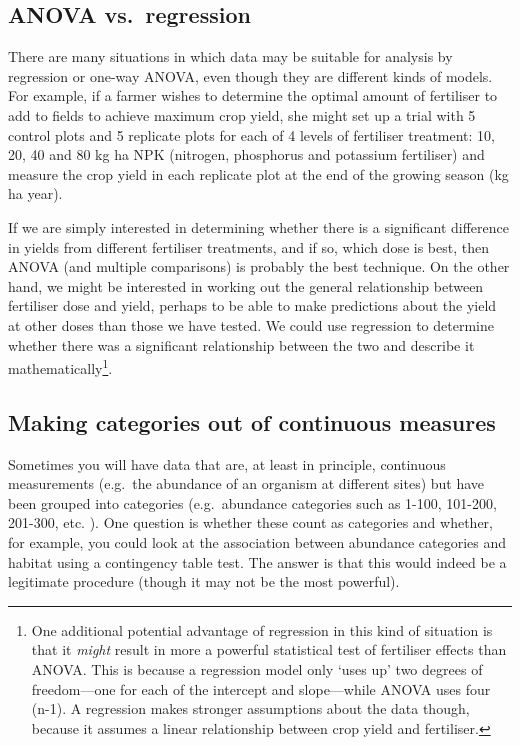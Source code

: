 \documentclass[
]{book}
\begin{document}
\hypertarget{anova-vs.-regression}{%
\subsection{ANOVA vs.~regression}\label{anova-vs.-regression}}

There are many situations in which data may be suitable for analysis by regression or one-way ANOVA, even though they are different kinds of models. For example, if a farmer wishes to determine the optimal amount of fertiliser to add to fields to achieve maximum crop yield, she might set up a trial with 5 control plots and 5 replicate plots for each of 4 levels of fertiliser treatment: 10, 20, 40 and 80 kg ha NPK (nitrogen, phosphorus and potassium fertiliser) and measure the crop yield in each replicate plot at the end of the growing season (kg ha year).

If we are simply interested in determining whether there is a significant difference in yields from different fertiliser treatments, and if so, which dose is best, then ANOVA (and multiple comparisons) is probably the best technique. On the other hand, we might be interested in working out the general relationship between fertiliser dose and yield, perhaps to be able to make predictions about the yield at other doses than those we have tested. We could use regression to determine whether there was a significant relationship between the two and describe it mathematically\footnote{One additional potential advantage of regression in this kind of situation is that it \emph{might} result in more a powerful statistical test of fertiliser effects than ANOVA. This is because a regression model only `uses up' two degrees of freedom---one for each of the intercept and slope---while ANOVA uses four (n-1). A regression makes stronger assumptions about the data though, because it assumes a linear relationship between crop yield and fertiliser.}.

\hypertarget{making-categories-out-of-continuous-measures}{%
\subsection{Making categories out of continuous measures}\label{making-categories-out-of-continuous-measures}}

Sometimes you will have data that are, at least in principle, continuous measurements (e.g.~the abundance of an organism at different sites) but have been grouped into categories (e.g.~abundance categories such as 1-100, 101-200, 201-300, etc. ). One question is whether these count as categories and whether, for example, you could look at the association between abundance categories and habitat using a contingency table test. The answer is that this would indeed be a legitimate procedure (though it may not be the most powerful).
\end{document}
